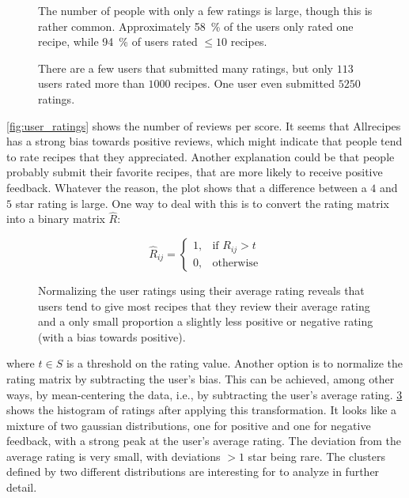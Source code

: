 \begin{figure}[htbp]
	\centering
	
	\caption{The number of people with only a few ratings is large, though this is rather common. Approximately \SI{58}{\percent} of the users only rated one recipe, while \SI{94}{\percent} of users rated $\leq 10$ recipes.}
	\label{fig:user_little_ratings}
\end{figure}

\begin{figure}[htbp]
	\centering
	
	\caption{There are a few users that submitted many ratings, but only $113$ users rated more than $1000$ recipes. One user even submitted $\num{5250}$ ratings.}
	\label{fig:user_many_ratings}
\end{figure}

\cref{fig:user_ratings} shows the number of reviews per score.
It seems that Allrecipes has a strong bias towards positive reviews, which might indicate that people tend to rate recipes that they appreciated.
Another explanation could be that people probably submit their favorite recipes, that are more likely to receive positive feedback.
Whatever the reason, the plot shows that a difference between a $4$ and $5$ star rating is large.
One way to deal with this is to convert the rating matrix into a binary matrix $\hat{R}$:

\begin{equation*}
	\tag{Binary Rating matrix}
	\hat{R}_{ij}=
	\begin{cases}
	    1,& \text{if } R_{ij}>t \\
	    0,& \text{otherwise}
	\end{cases}
\end{equation*}

\begin{figure}[htbp]
	\centering
	
	\caption{Normalizing the user ratings using their average rating reveals that users tend to give most recipes that they review their average rating and a only small proportion a slightly less positive or negative rating (with a bias towards positive).}
	\label{fig:normalized_ratings}
\end{figure}

\noindent where $t \in S$ is a threshold on the rating value.
Another option is to normalize the rating matrix by subtracting the user's bias.
This can be achieved, among other ways, by mean-centering the data, i.e., by subtracting the user's average rating.
\cref{fig:normalized_ratings} shows the histogram of ratings after applying this transformation.
It looks like a mixture of two gaussian distributions, one for positive and one for negative feedback, with a strong peak at the user's average rating.
The deviation from the average rating is very small, with deviations $>1$ star being rare.
The clusters defined by two different distributions are interesting for to analyze in further detail.